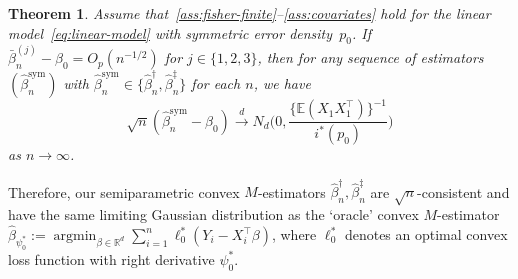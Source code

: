 \documentclass[a4paper]{article}
\newcommand{\R}{\mathbb{R}}
\newcommand{\E}{\mathbb{E}}
\newcommand{\cvd}{\overset{d}{\to}}
\DeclareMathOperator*{\argmin}{argmin}
\newtheorem{theorem}{Theorem}
\theoremstyle{definition}
\begin{document}
\begin{theorem}
\label{thm:linreg-score-sym}
Assume that~\emph{\ref{ass:fisher-finite}--\ref{ass:covariates}} hold for the linear model~\eqref{eq:linear-model} with symmetric error density~$p_0$.  If $\bar{\beta}_n^{(j)} - \beta_0 = O_p(n^{-1/2})$ for $j \in \{1,2,3\}$, then for any sequence of estimators $(\hat{\beta}_n^{\mathrm{sym}})$ with $\hat{\beta}_n^{\mathrm{sym}} \in \{\hat{\beta}_n^\dagger,\hat{\beta}_n^\ddagger\}$ for each $n$, we have
\[
\sqrt{n}(\hat{\beta}_n^{\mathrm{sym}} - \beta_0) \cvd N_d\biggl(0, \frac{\{\E(X_1 X_1^\top)\}^{-1}}{i^*(p_0)}\biggr)
\]
as $n \to \infty$.
\end{theorem}

Therefore, our semiparametric convex $M$-estimators $\hat{\beta}_n^\dagger,\hat{\beta}_n^\ddagger$ are $\sqrt{n}$-consistent and have the same limiting Gaussian distribution as the `oracle' convex $M$-estimator $\hat{\beta}_{\psi_0^*} := \argmin_{\beta \in \R^d} \sum_{i=1}^n \ell_0^*(Y_i - X_i^\top\beta)$, where $\ell_0^*$ denotes an optimal convex loss function with right derivative $\psi_0^*$.
\end{document}
